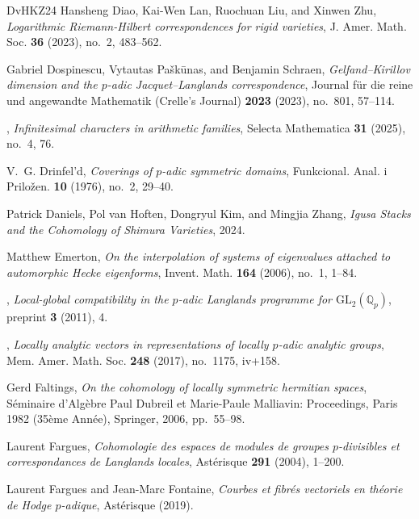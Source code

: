\documentclass{article}
\theoremstyle{definition}
\begin{document}
\begin{thebibliography}{DvHKZ24}
Hansheng Diao, Kai-Wen Lan, Ruochuan Liu, and Xinwen Zhu, \emph{Logarithmic {R}iemann-{H}ilbert correspondences for rigid varieties}, J. Amer. Math. Soc. \textbf{36} (2023), no.~2, 483--562. 

Gabriel Dospinescu, Vytautas Pa{\v{s}}k{\=u}nas, and Benjamin Schraen, \emph{{Gelfand--Kirillov dimension and the $p$-adic Jacquet--Langlands correspondence}}, Journal f{\"u}r die reine und angewandte Mathematik (Crelle's Journal) \textbf{2023} (2023), no.~801, 57--114.

\bysame, \emph{Infinitesimal characters in arithmetic families}, Selecta Mathematica \textbf{31} (2025), no.~4, 76.

V.~G. Drinfel'd, \emph{Coverings of {$p$}-adic symmetric domains}, Funkcional. Anal. i Prilo\v{z}en. \textbf{10} (1976), no.~2, 29--40. 

Patrick Daniels, Pol van Hoften, Dongryul Kim, and Mingjia Zhang, \emph{{Igusa Stacks and the Cohomology of Shimura Varieties}}, 2024.

Matthew Emerton, \emph{On the interpolation of systems of eigenvalues attached to automorphic {H}ecke eigenforms}, Invent. Math. \textbf{164} (2006), no.~1, 1--84. 

\bysame, \emph{{Local-global compatibility in the $p$-adic Langlands programme for $\mathrm{GL}_2(\mathbb{Q}_p)$}}, preprint \textbf{3} (2011), 4.

\bysame, \emph{Locally analytic vectors in representations of locally {$p$}-adic analytic groups}, Mem. Amer. Math. Soc. \textbf{248} (2017), no.~1175, iv+158. 

Gerd Faltings, \emph{On the cohomology of locally symmetric hermitian spaces}, S{\'e}minaire d’Alg{\`e}bre Paul Dubreil et Marie-Paule Malliavin: Proceedings, Paris 1982 (35{\`e}me Ann{\'e}e), Springer, 2006, pp.~55--98.

Laurent Fargues, \emph{{Cohomologie des espaces de modules de groupes $p$-divisibles et correspondances de Langlands locales}}, Ast{\'e}risque \textbf{291} (2004), 1--200.

Laurent Fargues and Jean-Marc Fontaine, \emph{{Courbes et fibr{\'e}s vectoriels en th{\'e}orie de Hodge $p$-adique}}, Ast{\'e}risque (2019).


\end{thebibliography}
\end{document}
